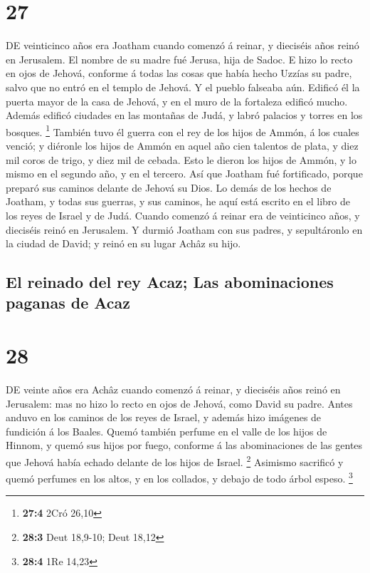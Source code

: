 \hypertarget{section-26}{%
\section{27}\label{section-26}}

 DE veinticinco años era Joatham cuando comenzó á reinar,
y dieciséis años reinó en Jerusalem. El nombre de su madre fué Jerusa,
hija de Sadoc.  E hizo lo recto en ojos de Jehová,
conforme á todas las cosas que había hecho Uzzías su padre, salvo que no
entró en el templo de Jehová. Y el pueblo falseaba aún. 
Edificó él la puerta mayor de la casa de Jehová, y en el muro de la
fortaleza edificó mucho.  Además edificó ciudades en las
montañas de Judá, y labró palacios y torres en los bosques. \footnote{\textbf{27:4}
  2Cró 26,10}  También tuvo él guerra con el rey de los
hijos de Ammón, á los cuales venció; y diéronle los hijos de Ammón en
aquel año cien talentos de plata, y diez mil coros de trigo, y diez mil
de cebada. Esto le dieron los hijos de Ammón, y lo mismo en el segundo
año, y en el tercero.  Así que Joatham fué fortificado,
porque preparó sus caminos delante de Jehová su Dios.  Lo
demás de los hechos de Joatham, y todas sus guerras, y sus caminos, he
aquí está escrito en el libro de los reyes de Israel y de Judá.
 Cuando comenzó á reinar era de veinticinco años, y
dieciséis reinó en Jerusalem.  Y durmió Joatham con sus
padres, y sepultáronlo en la ciudad de David; y reinó en su lugar Achâz
su hijo.

\hypertarget{el-reinado-del-rey-acaz-las-abominaciones-paganas-de-acaz}{%
\subsection{El reinado del rey Acaz; Las abominaciones paganas de
Acaz}\label{el-reinado-del-rey-acaz-las-abominaciones-paganas-de-acaz}}

\hypertarget{section-27}{%
\section{28}\label{section-27}}

 DE veinte años era Achâz cuando comenzó á reinar, y
dieciséis años reinó en Jerusalem: mas no hizo lo recto en ojos de
Jehová, como David su padre.  Antes anduvo en los caminos
de los reyes de Israel, y además hizo imágenes de fundición á los
Baales.  Quemó también perfume en el valle de los hijos de
Hinnom, y quemó sus hijos por fuego, conforme á las abominaciones de las
gentes que Jehová había echado delante de los hijos de Israel.
\footnote{\textbf{28:3} Deut 18,9-10; Deut 18,12} 
Asimismo sacrificó y quemó perfumes en los altos, y en los collados, y
debajo de todo árbol espeso. \footnote{\textbf{28:4} 1Re 14,23}

